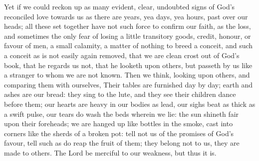 Yet if we could reckon up as many evident, clear, undoubted signs of God’s reconciled love towards us as there are years, yea days, yea hours, past over our heads; all these set together have not such force to confirm our faith, as the loss, and sometimes the only fear of losing a little transitory goods, credit, honour, or favour of men, a small calamity, a matter of nothing to breed a conceit, and such a conceit as is not easily again removed, that we are clean crost out of God’s book, that he regards us not, that he looketh upon others, but passeth by us like a stranger to whom we are not known. Then we think, looking upon others, and comparing them with ourselves, Their tables are furnished day by day; earth and ashes are our bread: they sing to the lute, and they see their children dance before them; our hearts are heavy in our bodies as lead, our sighs beat as thick as a swift pulse, our tears do wash the beds wherein we lie: the sun shineth fair upon their foreheads; we are hanged up like bottles in the smoke, cast into corners like the sherds of a broken pot: tell not us of the promises of God’s favour, tell such as do reap the fruit of them; they belong not to us, they are made to others. The Lord be merciful to our weakness, but thus it is.

